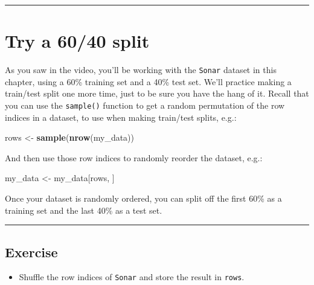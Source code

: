 \documentclass[]{book}
\newenvironment{Shaded}{\begin{snugshade}}{\end{snugshade}}
\newcommand{\KeywordTok}[1]{\textcolor[rgb]{0.13,0.29,0.53}{\textbf{#1}}}
\newcommand{\StringTok}[1]{\textcolor[rgb]{0.31,0.60,0.02}{#1}}
\newcommand{\NormalTok}[1]{#1}
\providecommand{\tightlist}{%
  \setlength{\itemsep}{0pt}\setlength{\parskip}{0pt}}
\begin{document}
\begin{center}\rule{0.5\linewidth}{\linethickness}\end{center}

\section{Try a 60/40 split}\label{try-a-6040-split}

As you saw in the video, you'll be working with the \texttt{Sonar}
dataset in this chapter, using a 60\% training set and a 40\% test set.
We'll practice making a train/test split one more time, just to be sure
you have the hang of it. Recall that you can use the \texttt{sample()}
function to get a random permutation of the row indices in a dataset, to
use when making train/test splits, e.g.:

\begin{Shaded}
\begin{Highlighting}[]
\NormalTok{rows <-}\StringTok{ }\KeywordTok{sample}\NormalTok{(}\KeywordTok{nrow}\NormalTok{(my_data))}
\end{Highlighting}
\end{Shaded}

And then use those row indices to randomly reorder the dataset, e.g.:

\begin{Shaded}
\begin{Highlighting}[]
\NormalTok{my_data <-}\StringTok{ }\NormalTok{my_data[rows, ]}
\end{Highlighting}
\end{Shaded}

Once your dataset is randomly ordered, you can split off the first 60\%
as a training set and the last 40\% as a test set.

\begin{center}\rule{0.5\linewidth}{\linethickness}\end{center}

\subsection*{Exercise}\label{exercise-9}

\begin{itemize}
\tightlist
\item
  Shuffle the row indices of \texttt{Sonar} and store the result in
  \texttt{rows}.
\end{itemize}
\end{document}

